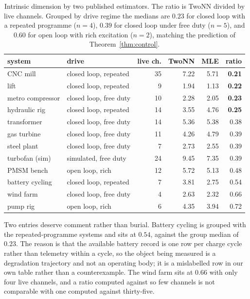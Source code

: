 \documentclass[11pt]{article}
\begin{document}
\begin{table}[t]
\centering
\begin{tabular}{llrrrr}
\toprule
system & drive & live ch. & TwoNN & MLE & ratio \\
\midrule
CNC mill          & closed loop, repeated & 35 & 7.22 & 5.71 & \textbf{0.21} \\
lift              & closed loop, repeated &  9 & 1.94 & 1.13 & \textbf{0.22} \\
metro compressor  & closed loop, free duty & 10 & 2.28 & 2.05 & \textbf{0.23} \\
hydraulic rig     & closed loop, repeated & 14 & 3.55 & 4.76 & \textbf{0.25} \\
transformer       & closed loop, free duty & 14 & 5.36 & 5.38 & 0.38 \\
gas turbine       & closed loop, free duty & 11 & 4.26 & 4.79 & 0.39 \\
steel plant       & closed loop, free duty &  7 & 2.73 & 2.55 & 0.39 \\
turbofan (sim)    & simulated, free duty  & 24 & 9.45 & 7.35 & 0.39 \\
PMSM bench        & open loop, rich       & 12 & 5.72 & 5.13 & 0.48 \\
battery cycling   & closed loop, repeated &  7 & 3.81 & 2.75 & 0.54 \\
wind farm         & closed loop, free duty &  4 & 2.63 & 2.32 & 0.66 \\
pump rig          & open loop, rich       &  6 & 4.35 & 3.94 & 0.72 \\
\bottomrule
\end{tabular}
\caption{Intrinsic dimension by two published estimators. The ratio is
TwoNN divided by live channels. Grouped by drive regime the medians are
$0.23$ for closed loop with a repeated programme ($n=4$), $0.39$ for closed
loop under free duty ($n=5$), and $0.60$ for open loop with rich excitation
($n=2$), matching the prediction of Theorem~\ref{thm:control}.}
\label{tab:survey}
\end{table}

Two entries deserve comment rather than burial. Battery cycling is grouped
with the repeated-programme systems and sits at $0.54$, against the group
median of $0.23$. The reason is that the available battery record is one row
per charge cycle rather than telemetry within a cycle, so the object being
measured is a degradation trajectory and not an operating body; it is a
mislabelled row in our own table rather than a counterexample. The wind farm
sits at $0.66$ with only four live channels, and a ratio computed against so
few channels is not comparable with one computed against thirty-five.
\end{document}
